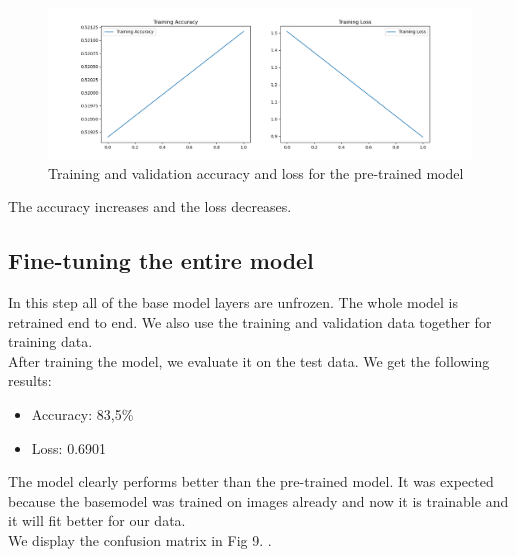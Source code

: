 \documentclass[conference]{IEEEtran}
\begin{document}
\begin{figure}[htbp]
	\centerline{\includegraphics[width=\linewidth]{Images/Transferlearning_2.png}}
	\caption{Training and validation accuracy and loss for the pre-trained model}
	\label{fig:transferlearning_2}
\end{figure}

The accuracy increases and the loss decreases.

\subsection{Fine-tuning the entire model}
In this step all of the base model layers are unfrozen. The whole model is retrained end to end. We also use the training and validation data together for training data.\\

After training the model, we evaluate it on the test data. We get the following results:\\

\begin{itemize}
	\item Accuracy: 83,5\%
	\item Loss: 0.6901
\end{itemize}

The model clearly performs better than the pre-trained model. It was expected because the basemodel was trained on images already and now it is trainable and it will fit better for our data.\\

We display the confusion matrix in Fig 9. .
\end{document}
